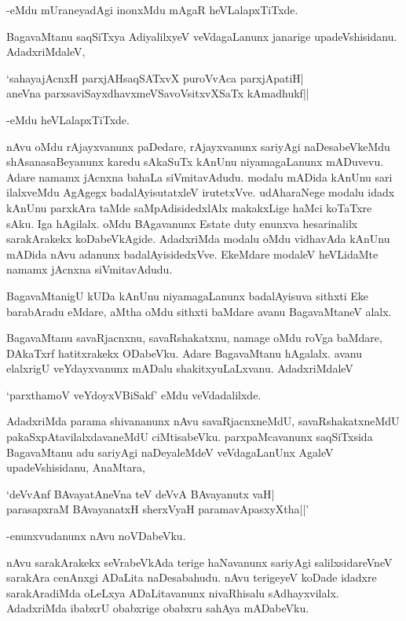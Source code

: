 -eMdu mUraneyadAgi inonxMdu mAgaR heVLalapxTiTxde.

BagavaMtanu saqSiTxya AdiyalilxyeV veVdagaLanunx janarige upadeVshisidanu. AdadxriMdaleV,

\begin{shloka}
`sahayajAcnxH parxjAHsaqSATxvX puroVvAca parxjApatiH|\\
aneVna parxsaviSayxdhavxmeVSavoV\s sitxvXSaTx kAmadhukf||
\end{shloka}

-eMdu heVLalapxTiTxde.

nAvu oMdu rAjayxvanunx paDedare, rAjayxvanunx sariyAgi naDesabeVkeMdu shAsanasaBeyanunx karedu sAkaSuTx kAnUnu niyamagaLanunx mADuvevu. Adare namamx jAcnxna bahaLa siVmitavAdudu. modalu mADida kAnUnu sari ilalxveMdu AgAgegx badalAyisutatxleV irutetxVve. udAharaNege modalu idadx kAnUnu parxkAra taMde saMpAdisidedxlAlx makakxLige haMci koTaTxre sAku. Iga hAgilalx. oMdu BAgavanunx {\eng Estate duty} enunxva hesarinalilx sarakArakekx koDabeVkAgide. AdadxriMda modalu oMdu vidhavAda kAnUnu mADida nAvu adanunx badalAyisidedxVve. EkeMdare modaleV heVLidaMte namamx jAcnxna siVmitavAdudu.

BagavaMtanigU kUDa kAnUnu niyamagaLanunx badalAyisuva sithxti Eke barabAradu eMdare, aMtha oMdu sithxti baMdare avanu BagavaMtaneV alalx. 

BagavaMtanu savaRjacnxnu, savaRshakatxnu, namage oMdu roVga baMdare, DAkaTxrf hatitxrakekx ODabeVku. Adare BagavaMtanu hAgalalx. avanu elalxrigU veYdayxvanunx mADalu shakitxyuLaLxvanu. AdadxriMdaleV

\begin{shloka}
`parxthamoV veYdoyxVBiSakf' eMdu veVdadalilxde.
\end{shloka}

AdadxriMda parama shivananunx nAvu savaRjacnxneMdU, savaRshakatxneMdU pakaSxpAtavilalxdavaneMdU ciMtisabeVku. parxpaMcavanunx saqSiTxsida BagavaMtanu adu sariyAgi naDeyaleMdeV veVdagaLanUnx AgaleV upadeVshisidanu, AnaMtara,

\begin{shloka}
`deVvAnf BAvayatAneVna teV deVvA BAvayanutx vaH|\\
parasapxraM BAvayanatxH sherxVyaH paramavApasxyXtha||'
\end{shloka}

-enunxvudanunx nAvu noVDabeVku.

nAvu sarakArakekx seVrabeVkAda terige haNavanunx sariyAgi salilxsidareVneV sarakAra cenAnxgi ADaLita naDesabahudu. nAvu terigeyeV koDade idadxre sarakAradiMda oLeLxya ADaLitavanunx nivaRhisalu sAdhayxvilalx. AdadxriMda ibabxrU obabxrige obabxru sahAya mADabeVku.

